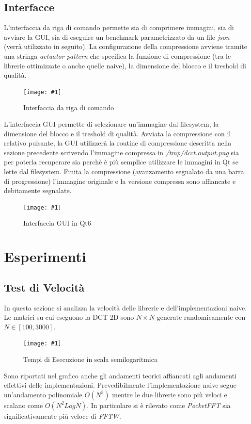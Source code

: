\documentclass[a4paper,11pt,oneside, table]{article}
\newcommand{\putimage}[4] {
	\begin{figure}[H]
	    \centering
	    \texttt{[image: \#1]}
	    \caption{#2}\label{#3}
	\end{figure}
}
\begin{document}
\subsection{Interfacce}

L'interfaccia da riga di comando permette sia di comprimere immagini, sia di avviare la GUI, sia di eseguire un benchmark parametrizzato da un file \textit{json} (verr\`a utilizzato in seguito).
La configurazione della compressione avviene tramite una stringa \textit{actuator-pattern} che specifica la funzione di compressione (tra le librerie ottimizzate o anche quelle naive), la dimensione del blocco e il treshold di qualit\`a.

\putimage{images/interface-cli.png}{Interfaccia da riga di comando}{png:interface_cli}{0.99}

L'interfaccia GUI permette di selezionare un'immagine dal filesystem, la dimensione del blocco e il treshold di qualit\`a.
Avviata la compressione con il relativo pulsante, la GUI utilizzer\`a la routine di compressione descritta nella sezione precedente scrivendo l'immagine compressa in \textit{/tmp/dcct.output.png} sia per poterla recuperare sia perch\`e \`e pi\`u semplice utilizzare le immagini in Qt se lette dal filesystem.
Finita la compressione (avanzamento segnalato da una barra di progressione) l'immagine originale e la versione compressa sono affiancate e debitamente segnalate.

\putimage{images/interface-gui.png}{Interfaccia GUI in Qt6}{png:interface_gui}{0.99}

\section{Esperimenti}

\subsection{Test di Velocit\`a}

In questa sezione si analizza la velocit\`a delle librerie e dell'implementazioni naive.
Le matrici su cui eseguono la DCT 2D sono $N \times N$ generate randomicamente con $N \in [100, 3000]$.

\putimage{images/actuator-trends.png}{Tempi di Esecuzione in scala semilogaritmica}{png:actuator-trends}{0.99}

Sono riportati nel grafico anche gli andamenti teorici affiancati agli andamenti effettivi delle implementazioni.
Prevedibilmente l'implementazione naive segue un'andamento polinomiale $O(N^3)$ mentre le due librerie sono pi\`u veloci e scalano come $O(N^2 Log N)$.
In particolare si \`e rilevato come \textit{PocketFFT} sia significativamente pi\`u veloce di \textit{FFTW}.
\end{document}
